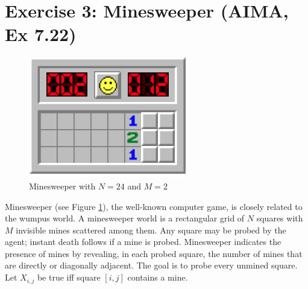 \documentclass[9pt,a4paper]{extarticle}
\begin{document}
 \section*{Exercise 3: Minesweeper (AIMA, Ex 7.22)}
 \begin{figure}[h]
     \centering
     \includegraphics[width=.35\textwidth]{figures/minesweeper.png}
     \caption{Minesweeper with $N = 24$ and $M=2$}
     \label{fig:minesweeper}
 \end{figure}
Minesweeper (see Figure \ref{fig:minesweeper}), the well-known computer game, is closely related to the wumpus world. A minesweeper world is a rectangular grid of $N$ squares with $M$ invisible mines scattered among them. Any square may be probed by the agent; instant death follows if a mine is probed. Minesweeper indicates the presence of mines by revealing, in each probed square, the number of mines that are directly or diagonally adjacent. The goal is to probe every unmined square. Let $X_{i,j}$ be true iff square $\left[i, j\right]$ contains a mine. 
\end{document}
